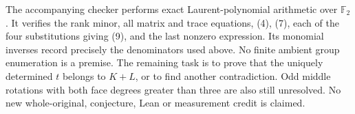 \documentclass[11pt,a4paper]{article}
\begin{document}
The accompanying checker performs exact Laurent-polynomial arithmetic
over $\mathbb F_2$. It verifies the rank minor, all matrix and trace
equations, (4), (7), each of the four substitutions giving (9), and the
last nonzero expression. Its monomial inverses record precisely the
denominators used above. No finite ambient group enumeration is a premise.
The remaining task is to prove that the uniquely determined $t$ belongs
to $K+L$, or to find another contradiction. Odd middle rotations with
both face degrees greater than three are also still unresolved. No new
whole-original, conjecture, Lean or measurement credit is claimed.
\end{document}
